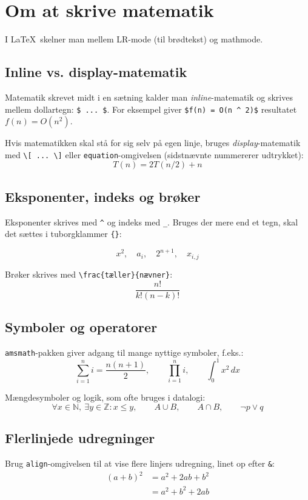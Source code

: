 \chapter{Om at skrive matematik}

I \LaTeX\ skelner man mellem LR-mode (til brødtekst) og mathmode.

\section{Inline vs. display-matematik}

Matematik skrevet midt i en sætning kalder man \emph{inline}-matematik og
skrives mellem dollartegn: \texttt{\$ ... \$}. For eksempel giver
\texttt{\$f(n) = O(n \^{} 2)\$} resultatet $f(n) = O(n^2)$.
 
Hvis matematikken skal stå for sig selv på egen linje, bruges
\emph{display}-matematik med \texttt{\textbackslash[ ... \textbackslash]}
eller \texttt{equation}-omgivelsen (sidstnævnte nummererer udtrykket):
\begin{equation}
  T(n) = 2T(n/2) + n
\end{equation}
 
\section{Eksponenter, indeks og brøker}
Eksponenter skrives med \texttt{\^{}} og indeks med \texttt{\_}.
Bruges der mere end et tegn, skal det sættes i tuborgklammer \texttt{\{\}}:
 
\[
  x^2, \quad a_i, \quad 2^{n+1}, \quad x_{i,j}
\]
 
Brøker skrives med \texttt{\textbackslash frac\{tæller\}\{nævner\}}:
\[
  \frac{n!}{k!(n-k)!}
\]
 
\section{Symboler og operatorer}
\texttt{amsmath}-pakken giver adgang til mange nyttige symboler, f.eks.:
\[
  \sum_{i=1}^{n} i = \frac{n(n+1)}{2}, \qquad
  \prod_{i=1}^{n} i, \qquad
  \int_0^1 x^2 \, dx
\]
 
Mængdesymboler og logik, som ofte bruges i datalogi:
\[
  \forall x \in \mathbb{N},\ \exists y \in \mathbb{Z} : x \le y,
  \qquad A \cup B, \qquad A \cap B, \qquad \neg p \lor q
\]
 
\section{Flerlinjede udregninger}
Brug \texttt{align}-omgivelsen til at vise flere linjers udregning,
linet op efter \texttt{\&}:
\begin{align}
  (a+b)^2 &= a^2 + 2ab + b^2 \\
  &= a^2 + b^2 + 2ab
\end{align}
 
